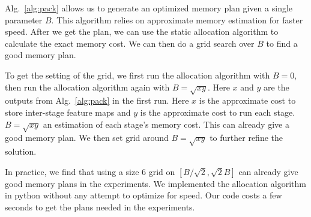 \documentclass{article} %
\begin{document}
Alg.~\ref{alg:pack} allows us to generate an optimized memory plan given
a single parameter $B$. This algorithm relies on approximate memory estimation for faster speed.
After we get the plan, we can use the static allocation algorithm to
calculate the exact memory cost. We can then do a grid search over $B$ to find a good memory plan.

To get the setting of the grid, we first run the allocation algorithm with $B=0$, then
run the allocation algorithm again with $B=\sqrt{x y}$. Here $x$ and $y$ are the outputs from Alg.~\ref{alg:pack} in the first run.
Here $x$ is the approximate cost to store inter-stage feature maps and $y$ is the approximate cost to run each stage. $B=\sqrt{x y}$ an estimation of each stage's memory cost.
This can already give a good memory plan. We then set grid around $B = \sqrt{x y}$ to further refine the solution.

In practice, we find that using a size $6$ grid on $[B/\sqrt{2}, \sqrt{2}B]$ can already give good memory plans in the experiments.
We implemented the allocation algorithm in python without any attempt to optimize for speed. Our code costs a few seconds
to get the plans needed in the experiments.
\end{document}
